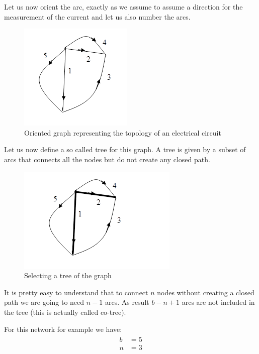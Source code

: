 Let us now orient the arc, exactly as we assume to assume a direction for the measurement of the current and let us also number the arcs.

\begin{figure}[ht]
	\centering
	\includegraphics[scale=0.6]{img/graph_representation_2.png} 
	\caption{Oriented graph representing the topology of an electrical circuit}
	\label{fig:graph_rep_2}
\end{figure}

Let us now define a so called tree for this graph. A tree is given by a subset of arcs that connects all the nodes but do not create any closed path.

\begin{figure}[ht]
	\centering
	\includegraphics[scale=0.6]{img/graph_representation_3.png} 
	\caption{Selecting a tree of the graph}
	\label{fig:graph_rep_3}
\end{figure}

It is pretty easy to understand that to connect $n$ nodes without creating a closed path we are going to need $n-1$ arcs. As result $b-n+1$ arcs are not included in the tree (this is actually called co-tree).

For this network for example we have:
\begin{align}
\begin{split}
	b &= 5 \\
	n &= 3
\end{split}
\end{align}

